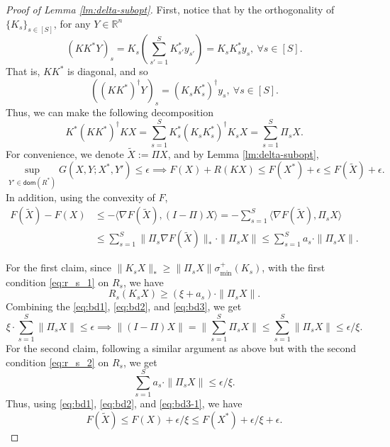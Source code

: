 \documentclass[10pt]{article}
\newcommand{\R}{\mathbb{R}}
\newcommand{\domain}{\mathsf{dom}}
\begin{document}
\begin{proof}[Proof of Lemma \ref{lm:delta-subopt}]
First, notice that by the orthogonality of $\{K_s\}_{s\in [S]}$, for any $Y\in \R^n$
\begin{displaymath}
    (KK^*Y)_{s} =K_{s}(\sum_{s'=1}^S K_{s'}^*y_{s'}) = K_sK_s^*y_s, ~\forall s\in [S].
\end{displaymath}
That is, $KK^*$ is diagonal, and so 
\begin{displaymath}
    ((KK^*)^{\dagger}Y)_s =  (K_sK_s^*)^{\dagger}y_s, ~\forall s\in [S].
\end{displaymath}
Thus, we can make the following decomposition
\begin{displaymath}
    K^*(KK^*)^{\dagger}KX = \sum_{s=1}^SK_s^*(K_sK_s^*)^{\dagger}K_sX=\sum_{s=1}^S\Pi_sX.
\end{displaymath}
For convenience, we denote $\widetilde{X}:=\Pi X$, and by Lemma \ref{lm:delta-subopt},
\begin{equation}\label{eq:bd1}
    \sup_{Y'\in \domain(R^*)} G(X,Y;X^*,Y')\leq \epsilon \implies F(X) + R(KX) \leq F(X^*) + \epsilon\leq F(\widetilde{X}) + \epsilon.
\end{equation}
In addition, using the convexity of $F$,
\begin{align}\label{eq:bd2}
   F(\widetilde{X}) - F(X) &\leq -\langle \nabla F(\widetilde{X}), (I-\Pi)X\rangle= -\sum_{s=1}^S \langle \nabla F(\widetilde{X}), \Pi_sX\rangle\nonumber\\
   &\leq \sum_{s=1}^S \|\Pi_s \nabla F(\widetilde{X})\|_*\cdot \|\Pi_sX\|\leq \sum_{s=1}^S a_s \cdot \|\Pi_sX\|.
\end{align}

For the first claim, since $\|K_sX\|_*\geq \|\Pi_sX\|\sigma_{\min}^+(K_s)$, with the first condition \eqref{eq:r_s_1} on $R_s$, we have
\begin{equation}\label{eq:bd3}
    R_s(K_sX) \geq (\xi + a_s)\cdot \|\Pi_sX\|.
\end{equation}
Combining the \eqref{eq:bd1}, \eqref{eq:bd2}, and \eqref{eq:bd3}, we get
\begin{displaymath}
    \xi\cdot \sum_{s=1}^S \|\Pi_sX\|\leq \epsilon \implies \|(I-\Pi) X\|=\|\sum_{s=1}^S \Pi_sX\|\leq \sum_{s=1}^S \|\Pi_sX\| \leq \epsilon/\xi.
\end{displaymath}
For the second claim, following a similar argument as above but with the second condition \eqref{eq:r_s_2} on $R_s$, we get
\begin{equation}\label{eq:bd3-1}
    \sum_{s=1}^S a_s\cdot \|\Pi_s X\| \leq \epsilon/\xi.
\end{equation}
Thus, using \eqref{eq:bd1}, \eqref{eq:bd2}, and \eqref{eq:bd3-1}, we have
\begin{displaymath}
        F(\widetilde{X}) \leq F(X) + \epsilon/\xi \leq F(X^*) + \epsilon/\xi + \epsilon.
\end{displaymath}
\end{proof}
\end{document}
